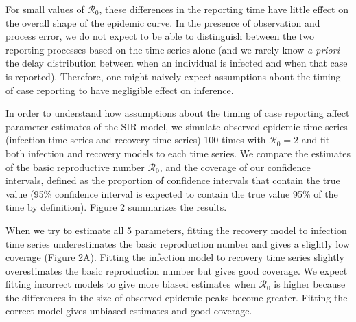 \documentclass[12pt]{article}\usepackage[]{graphicx}\usepackage[]{color}
\begin{document}
For small values of $\mathcal R_0$, 
these differences in the reporting time have little effect on the overall shape 
of the epidemic curve. In the presence of observation and process error, we
do not expect to be able to distinguish between the two reporting processes
based on the time series alone (and we rarely know \emph{a priori} the delay distribution between when an individual is infected and when that case is reported).
Therefore, one might naively expect assumptions about the timing of case reporting to have negligible effect on inference.

In order to understand how assumptions about the timing of case reporting affect 
parameter estimates of the SIR model, we simulate observed epidemic time series
(infection time series and recovery time series) 
100 times with $\mathcal R_0 = 2$ and fit both infection and recovery models to each 
time series. We compare the estimates of the basic reproductive number $\mathcal R_0$,
and the coverage of our confidence intervals, defined as the proportion of confidence intervals that
contain the true value (95\% confidence interval is expected to contain the true value
95\% of the time by definition). Figure 2 summarizes the results.

When we try to estimate all 5 parameters, fitting the recovery model to
infection time series underestimates the basic reproduction number and 
gives a slightly low coverage (Figure 2A). 
Fitting the infection model to recovery
time series slightly overestimates the basic reproduction number but gives 
good coverage. 
We expect fitting incorrect models to give more biased estimates when $\mathcal R_0$ is higher because the differences in the size of observed epidemic peaks become greater.
Fitting the correct model gives unbiased estimates and good coverage.
\end{document}
